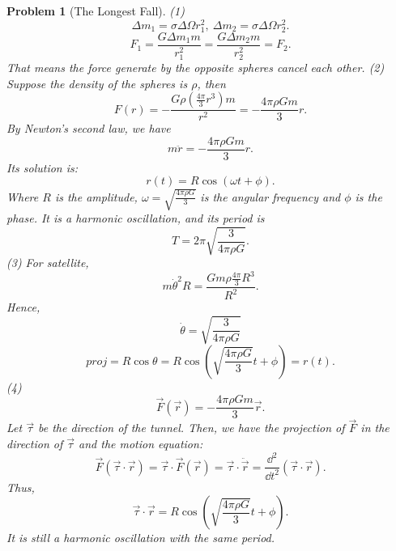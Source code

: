 \documentclass{article}
\theoremstyle{1}
\newtheorem{problem}{Problem}
\begin{document}
\newpage
\begin{problem}[The Longest Fall]
(1) 
\begin{equation}
    \Delta m_1=\sigma \Delta \Omega r_1^2,\ \Delta m_2=\sigma \Delta \Omega r_2^2.
\end{equation}
\begin{equation}
    F_1=\frac{G\Delta m_1 m}{r_1^2}=\frac{G\Delta m_2 m}{r_2^2}=F_2.
\end{equation}
That means the force generate by the opposite spheres cancel each other.
\newline
(2) Suppose the density of the spheres is $\rho$, then 
\begin{equation}
    F(r)=-\frac{G\rho \left(\frac{4\pi}{3}r^3\right)m}{r^2}=-\frac{4\pi \rho G m}{3}r.
\end{equation}
By Newton's second law, we have
\begin{equation}
    m\ddot{r}=-\frac{4\pi \rho Gm}{3}r.
\end{equation}
Its solution is:
\begin{equation}
    r(t)=R\cos(\omega t+\phi).
\end{equation}
Where $R$ is the amplitude, $\omega=\sqrt{\frac{4\pi \rho G}{3}}$ is the angular frequency and $\phi$ is the phase. It is a harmonic oscillation, and its period is 
\begin{equation}
    T=2\pi\sqrt{\frac{3}{4\pi \rho G}{}}.
\end{equation}
(3) For satellite, 
\begin{equation}
    m\dot{\theta}^2R=\frac{Gm\rho \frac{4\pi}{3}R^3}{R^2}.
\end{equation}
Hence, 
\begin{equation}
    \dot{\theta}=\sqrt{\frac{3}{4\pi \rho G}{}}
\end{equation}
\begin{equation}
    proj=R\cos\theta=R\cos\left(\sqrt{\frac{4\pi \rho G}{3}}t+\phi\right)=r(t).
\end{equation}
(4)
\begin{equation}
    \vec{F}(\vec{r})=-\frac{4\pi\rho  Gm}{3}\vec{r}.
\end{equation}
Let $\vec{\tau}$ be the direction of the tunnel. Then, we have the projection of $\vec{F}$ in the direction of $\vec{\tau}$ and the motion equation:
\begin{equation}
    \vec{F}(\vec{\tau}\cdot\vec{r})=\vec{\tau}\cdot\vec{F}(\vec{r})=\vec{\tau }\cdot\ddot{\vec{r}}=\frac{\dd^2}{\dd t^2}(\vec{\tau}\cdot\vec{r}).
\end{equation}
Thus,
\begin{equation}
    \vec{\tau}\cdot\vec{r}=R\cos\left(\sqrt{\frac{4\pi \rho G}{3}}t+\phi\right).
\end{equation}
It is still a harmonic oscillation with the same period.
\end{problem}
\end{document}
